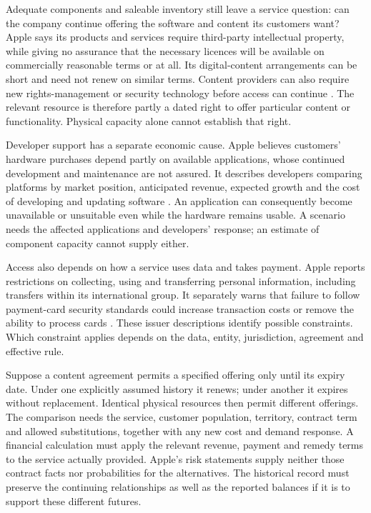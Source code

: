 Adequate components and saleable inventory still leave a service question:
can the company continue offering the software and content its customers want?
Apple says its products and services require third-party intellectual property,
while giving no assurance that the necessary licences will be available on
commercially reasonable terms or at all. Its digital-content arrangements can
be short and need not renew on similar terms. Content providers can also require
new rights-management or security technology before access can continue
\citep[Risk Factors, printed pp.~9--10]{apple2024}. The relevant resource is
therefore partly a dated right to offer particular content or functionality.
Physical capacity alone cannot establish that right.

Developer support has a separate economic cause. Apple believes customers'
hardware purchases depend partly on available applications, whose continued
development and maintenance are not assured. It describes developers comparing
platforms by market position, anticipated revenue, expected growth and the cost
of developing and updating software \citep[Risk Factors, printed p.~10]{apple2024}.
An application can consequently become unavailable or unsuitable even while
the hardware remains usable. A scenario needs the affected applications and
developers' response; an estimate of component capacity cannot supply either.

Access also depends on how a service uses data and takes payment. Apple reports
restrictions on collecting, using and transferring personal information,
including transfers within its international group. It separately warns that
failure to follow payment-card security standards could increase transaction
costs or remove the ability to process cards
\citep[Risk Factors, printed p.~15]{apple2024}. These issuer descriptions
identify possible constraints. Which constraint applies depends on the
data, entity, jurisdiction, agreement and effective rule.

Suppose a content agreement permits a specified offering only until its expiry
date. Under one explicitly assumed history it renews; under another it expires
without replacement. Identical physical resources then permit different
offerings. The comparison needs the service, customer population, territory,
contract term and allowed substitutions, together with any new cost and demand
response. A financial calculation must apply the relevant revenue, payment
and remedy terms to the service actually provided. Apple's risk statements
supply neither those contract facts nor probabilities for the alternatives.
The historical record must preserve the continuing relationships as well as
the reported balances if it is to support these different futures.
